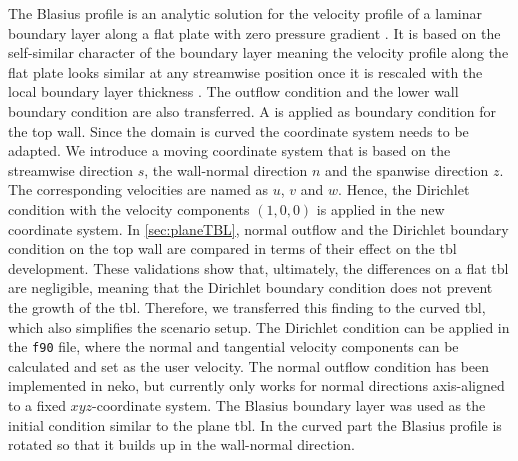 The Blasius profile is an analytic solution for the velocity profile of a laminar boundary layer along a flat plate with zero pressure gradient \citep{blasius_grenzschichtern_1908}.
It is based on the self-similar character of the boundary layer meaning the velocity profile along the flat plate looks similar at any streamwise position once it is rescaled with the local boundary layer thickness \citep{schlichting_boundary-layer_2017}.
The outflow condition and the lower wall boundary condition are also transferred.
A  is applied as boundary condition for the top wall.
Since the domain is curved the coordinate system needs to be adapted.
We introduce a moving coordinate system that is based on the streamwise direction $s$, the wall-normal direction $n$ and the spanwise direction $z$.
The corresponding velocities are named as $u$, $v$ and $w$.
Hence, the Dirichlet condition with the velocity components $(1,0,0)$ is applied in the new coordinate system.
In \autoref{sec:planeTBL}, normal outflow and the Dirichlet  boundary condition on the top wall are compared  in terms of their effect on the \acrshort{tbl} development.
These validations show that, ultimately, the differences on a flat \acrshort{tbl} are negligible, meaning that the Dirichlet boundary condition does not prevent the growth of the \acrshort{tbl}.
Therefore, we transferred this finding to the curved \acrshort{tbl}, which also simplifies the scenario setup.
The Dirichlet condition can be applied in the \texttt{f90} file, where the normal and tangential velocity components can be calculated and set as the user velocity. 
The normal outflow condition has been  implemented in neko, but currently only works for normal directions axis-aligned to a fixed $xyz$-coordinate system. 
The Blasius boundary layer was used as the initial condition similar to the plane \acrshort{tbl}.
In the curved part the Blasius profile is rotated so that it builds up in the wall-normal direction. \\

